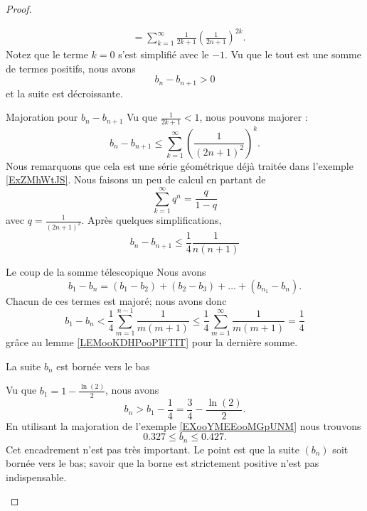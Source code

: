 \begin{proof}
\begin{subproof}
\begin{subequations}
\begin{align}
                    &=\sum_{k=1}^{\infty}  \frac{1}{ 2k+1 }  \left( \frac{1}{ 2n+1 } \right)^{2k}.
                \end{align}
            \end{subequations}
            Notez que le terme \( k=0\) s'est simplifié avec le \( -1\). Vu que le tout est une somme de termes positifs, nous avons
            \begin{equation}
                b_n-b_{n+1}>0
            \end{equation}
            et la suite est décroissante.
        \item[Majoration pour \( b_n-b_{n+1}\)]
            Vu que \( \frac{1}{ 2k+1 }<1\), nous pouvons majorer :
            \begin{equation}
                b_n-b_{n+1}\leq \sum_{k=1}^{\infty}\left( \frac{1}{ (2n+1)^2 } \right)^k.
            \end{equation}
            Nous remarquons que cela est une série géométrique déjà traitée dans l'exemple \ref{ExZMhWtJS}. Nous faisons un peu de calcul en partant de 
            \begin{equation}
                \sum_{k=1}^{\infty}q^n=\frac{ q }{ 1-q }
            \end{equation}
            avec \( q=\frac{1}{ (2n+1)^2 }\). Après quelques simplifications,
            \begin{equation}
                b_n-b_{n+1}\leq \frac{1}{ 4 }\frac{ 1 }{ n(n+1) }
            \end{equation}
        \item[Le coup de la somme télescopique]
            Nous avons
            \begin{equation}
                b_1-b_n=(b_1-b_2)+(b_2-b_3)+\ldots+(b_{n_1}-b_n).
            \end{equation}
            Chacun de ces termes est majoré; nous avons donc
            \begin{equation}
                b_1-b_n<\frac{1}{ 4 }\sum_{m=1}^{n-1}\frac{1}{ m(m+1) }\leq \frac{1}{ 4 }\sum_{m=1}^{\infty}\frac{1}{ m(m+1) }=\frac{1}{ 4 }
            \end{equation}
            grâce au lemme \ref{LEMooKDHPooPlFTIT} pour la dernière somme.
        \item[La suite \( b_n\) est bornée vers le bas]

            Vu que \( b_1=1-\frac{ \ln(2) }{2}\), nous avons
            \begin{equation}
                b_n>b_1-\frac{1}{ 4 }=\frac{ 3 }{ 4 }-\frac{ \ln(2) }{ 2 }.
            \end{equation}
            En utilisant la majoration de l'exemple \ref{EXooYMEEooMGpUNM} nous trouvons
            \begin{equation}
                0.327\leq b_n\leq 0.427.
            \end{equation}
            Cet encadrement n'est pas très important. Le point est que la suite \( (b_n)\) soit bornée vers le bas; savoir que la borne est strictement positive n'est pas indispensable.


\end{subproof}
\end{proof}
